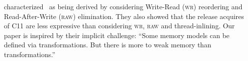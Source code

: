 \citet{DBLP:conf/fm/LahavV16} characterized \tso\ as being derived by
considering Write-Read (\textsc{wr}) reordering and Read-After-Write (\textsc{raw})
elimination.  They also showed that the release acquires of C11 are less
expressive than considering \textsc{wr}, \textsc{raw} and thread-inlining.  Our paper is
inspired by their implicit challenge: ``Some memory models can be defined via
transformations.  But there is more to weak memory than transformations.''


